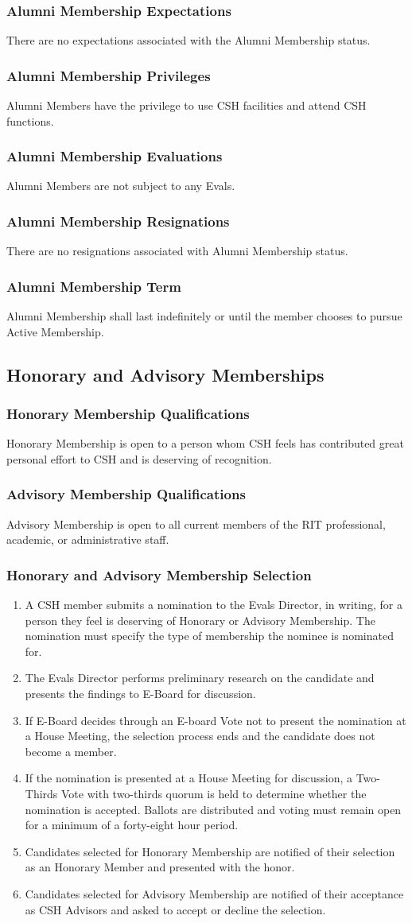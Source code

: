 \documentclass{article}
\newcommand{\asection}[1]{\subsection{#1} \label{#1}}
\newcommand{\asubsection}[1]{\subsubsection{#1} \label{#1}}
\begin{document}
\asubsection{Alumni Membership Expectations}
There are no expectations associated with the Alumni Membership status.

\asubsection{Alumni Membership Privileges}
Alumni Members have the privilege to use CSH facilities and attend CSH functions.

\asubsection{Alumni Membership Evaluations}
Alumni Members are not subject to any Evals.

\asubsection{Alumni Membership Resignations}
There are no resignations associated with Alumni Membership status.

\asubsection{Alumni Membership Term}
Alumni Membership shall last indefinitely or until the member chooses to pursue Active Membership.

\asection{Honorary and Advisory Memberships}

\asubsection{Honorary Membership Qualifications}
Honorary Membership is open to a person whom CSH feels has contributed great personal effort to CSH and is deserving of recognition.

\asubsection{Advisory Membership Qualifications}
Advisory Membership is open to all current members of the RIT professional, academic, or administrative staff.

\asubsection{Honorary and Advisory Membership Selection}
\begin{enumerate}
	\item A CSH member submits a nomination to the Evals Director, in writing, for a person they feel is deserving of Honorary or Advisory Membership. The nomination must specify the type of membership the nominee is nominated for.
	\item The Evals Director performs preliminary research on the candidate and presents the findings to E-Board for discussion.
	\item If E-Board decides through an E-board Vote not to present the nomination at a House Meeting, the selection process ends and the candidate does not become a member.
	\item If the nomination is presented at a House Meeting for discussion, a Two-Thirds Vote with two-thirds quorum is held to determine whether the nomination is accepted.
	      Ballots are distributed and voting must remain open for a minimum of a forty-eight hour period.
	\item Candidates selected for Honorary Membership are notified of their selection as an Honorary Member and presented with the honor.
	\item Candidates selected for Advisory Membership are notified of their acceptance as CSH Advisors and asked to accept or decline the selection.
\end{enumerate}
\end{document}
